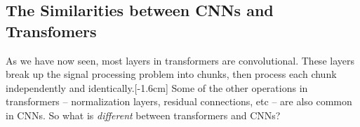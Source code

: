 
\subsection{The Similarities between CNNs and Transfomers}
As we have now seen, most layers in transformers are convolutional. These layers break up the signal processing problem into chunks, then process each chunk independently and identically.[-1.6cm] Some of the other operations in transformers -- normalization layers, residual connections, etc -- are also common in CNNs. So what is \textit{different} between transformers and CNNs?

